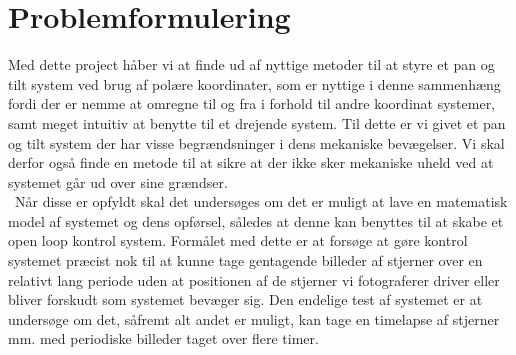 \section{Problemformulering}

Med dette project håber vi at finde ud af nyttige metoder til at styre et pan og tilt system ved brug af polære koordinater, som er nyttige i denne sammenhæng fordi der er nemme at omregne til og fra i forhold til andre koordinat systemer, samt meget intuitiv at benytte til et drejende system. Til dette er vi givet et pan og tilt system der har visse begrændsninger i dens mekaniske bevægelser. Vi skal derfor også finde en metode til at sikre at der ikke sker mekaniske uheld ved at systemet går ud over sine grændser.
\\\
Når disse er opfyldt skal det undersøges om det er muligt at lave en matematisk model af systemet og dens opførsel, således at denne kan benyttes til at skabe et open loop kontrol system. Formålet med dette er at forsøge at gøre kontrol systemet præcist nok til at kunne tage gentagende billeder af stjerner over en relativt lang periode uden at positionen af de stjerner vi fotograferer driver eller bliver forskudt som systemet bevæger sig. Den endelige test af systemet er at undersøge om det, såfremt alt andet er muligt, kan tage en timelapse af stjerner mm. med periodiske billeder taget over flere timer.

